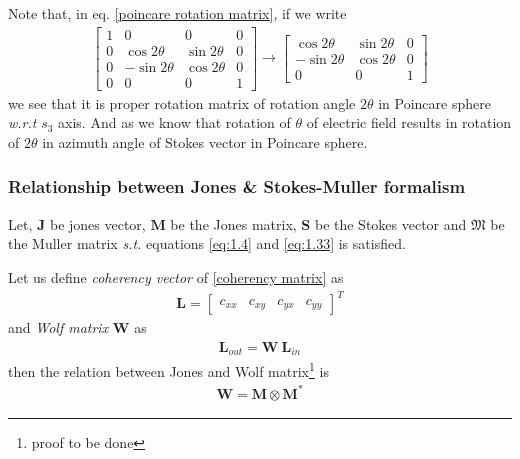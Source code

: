 \documentclass[11pt,a4paper]{article}
\numberwithin{equation}{section}
\begin{document}
Note that, in eq. \ref{poincare rotation matrix}, if we write
\begin{align}
	\begin{bmatrix}
		1 & 0 & 0 & 0\\
		0 & \cos2\theta & \sin2\theta & 0 \\
		0 & -\sin2\theta & \cos2\theta & 0\\
		0 & 0 & 0 & 1
	\end{bmatrix} \longrightarrow
	\begin{bmatrix}
		\cos2\theta & \sin2\theta & 0 \\
		-\sin2\theta & \cos2\theta & 0\\
		0 & 0 & 1
	\end{bmatrix}
\end{align}
we see that it is proper rotation matrix of rotation angle $2\theta$ in Poincare sphere \textit{w.r.t} $s_3$ axis. And as we know that rotation of $\theta$ of electric field results in rotation of $2\theta$ in azimuth angle of Stokes vector in Poincare sphere.

\subsubsection{Relationship between Jones \& Stokes-Muller formalism}
Let, $\boldsymbol{J}$ be jones vector, $\boldsymbol{M}$ be the Jones matrix, $\boldsymbol{S}$ be the Stokes vector and $\boldsymbol{\mathfrak{M}}$ be the Muller matrix \textit{s.t.} equations \ref{eq:1.4} and \ref{eq:1.33} is satisfied.

Let us define \textit{coherency vector} of \ref{coherency matrix} as 
\begin{align}
	\boldsymbol{L}=
	\begin{bmatrix}
		c_{xx} & c_{xy} & c_{yx} & c_{yy}
	\end{bmatrix}^T
\end{align}
and \textit{Wolf matrix} $\boldsymbol{W}$ as 
\begin{align}
	\boldsymbol{L}_{out}=\boldsymbol{W}\:\boldsymbol{L}_{in}
\end{align}
then the relation between Jones and Wolf matrix\footnote{proof to be done} is
\begin{align}
	\boldsymbol{W}=\boldsymbol{M}\otimes\boldsymbol{M}^\ast
\end{align}
\end{document}
